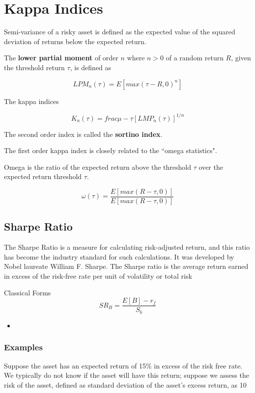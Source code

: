 \section{Kappa Indices}

Semi-variance of a risky asset is defined as the expected value of the squared deviation of returns below the expected return.

The \textbf{lower partial moment} of order $n$ where $n>0$ of a random return $R$, given the threshold return $\tau$, is defined as

\[LPM_n(\tau) = E\left[ max(\tau-R,0)^n\right] \]

The kappa indices

\[ K_n(\tau) =  frac{\mu-\tau}{[LMP_n(\tau)]^{1/n}} \]

The second order index is called the \textbf{sortino index}.

The first order kappa index is closely related to the ``omega statistics".

Omega is the ratio of the expected return above the threshold $\tau$ over the expected return threshold $\tau$.

\[  \omega(\tau) = \frac{E[max(R-\tau,0)]}{E[max(R-\tau,0)]} \]



\subsection{Sharpe Ratio}
The Sharpe Ratio is a measure for calculating risk-adjusted return, and this ratio has become the industry standard for such calculations. It was developed by Nobel laureate William F. Sharpe. The Sharpe ratio is the average return earned in excess of the risk-free rate per unit of volatility or total risk


Classical Forms
\[SR_B = \frac{E[B] - r_f}{S_b}\]

\begin{itemize}
\item
\end{itemize}
\subsubsection{Examples}

Suppose the asset has an expected return of 15\% in excess of the risk free rate. We typically do not know if the asset will have this return; suppose we assess the risk of the asset, defined as standard deviation of the asset's excess return, as 10%

